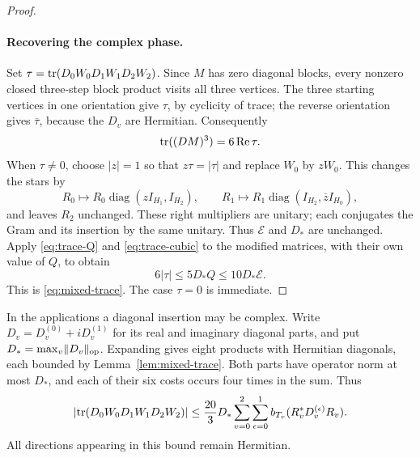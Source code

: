 \begin{proof}
\paragraph{Recovering the complex phase.}
Set $\tau=\operatorname{tr}(D_0W_0D_1W_1D_2W_2)$.  Since $M$ has zero
diagonal blocks, every nonzero closed three-step block product
visits all three vertices.  The three starting vertices in one
orientation give $\tau$, by cyclicity of trace; the reverse
orientation gives $\overline\tau$, because the $D_v$ are Hermitian.
Consequently
\[
 \operatorname{tr}((DM)^3)=6\operatorname{Re}\tau.
\]
When $\tau\ne0$, choose $|z|=1$ so that $z\tau=|\tau|$ and replace
$W_0$ by $zW_0$.  This changes the stars by
\[
 R_0\longmapsto R_0\operatorname{diag}(zI_{H_1},I_{H_2}),\qquad
 R_1\longmapsto R_1\operatorname{diag}(I_{H_2},\overline zI_{H_0}),
\]
and leaves $R_2$ unchanged.  These right multipliers are unitary;
each conjugates the Gram and its insertion by the same unitary.
Thus $\mathcal E$ and $D_*$ are unchanged.  Apply
\eqref{eq:trace-Q} and \eqref{eq:trace-cubic} to the modified
matrices, with their own value of $Q$, to obtain
\[
 6|\tau|\le5D_*Q\le10D_*\mathcal E.
\]
This is \eqref{eq:mixed-trace}.  The case $\tau=0$ is immediate.
\end{proof}

In the applications a diagonal insertion may be complex.  Write
$D_v=D_v^{(0)}+iD_v^{(1)}$ for its real and imaginary diagonal
parts, and put $D_* =\max_v\lVert D_v\rVert_{\mathrm{op}}$.  Expanding
gives eight products with Hermitian diagonals, each bounded by
Lemma~\ref{lem:mixed-trace}.  Both parts have operator norm at most
$D_*$, and each of their six costs occurs four times in the sum.
Thus
\begin{equation}\label{eq:complex-mixed-trace}
 \left|\operatorname{tr}(D_0W_0D_1W_1D_2W_2)\right|
 \le\frac{20}{3}D_*\sum_{v=0}^2\sum_{\epsilon=0}^1
 b_{T_v}(R_v^*D_v^{(\epsilon)}R_v).
\end{equation}
All directions appearing in this bound remain Hermitian.
